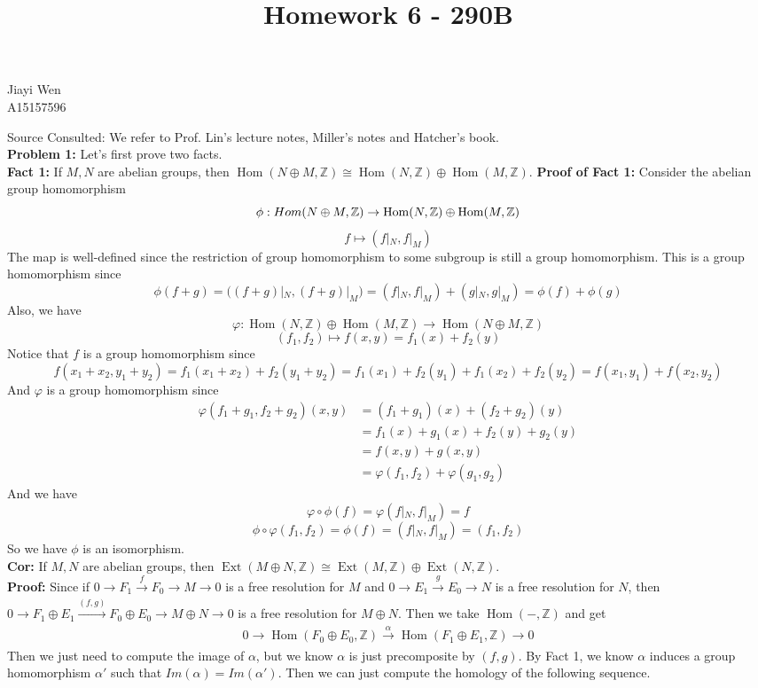 \documentclass[12pt]{amsart}
\newcommand{\Z}{\mathbb{Z}}
\newcommand{\Hom}{\operatorname{Hom}}
\newcommand{\Ext}{\operatorname{Ext}}
\begin{document}
\title{Homework 6 - 290B}
\maketitle
\begin{center}
    Jiayi Wen\\
    A15157596
\end{center}
Source Consulted: We refer to Prof. Lin's lecture notes, Miller's notes and Hatcher's book. \\
\textbf{Problem 1:} Let's first prove two facts.\\
\textbf{Fact 1:} If $M,N$ are abelian groups, then $\Hom(N\oplus M,\Z)\cong \Hom(N,\Z)\oplus \Hom(M,\Z)$. 
\textbf{Proof of Fact 1:} Consider the abelian group homomorphism 
\[\phi: \\Hom(N\oplus M, \Z)\to \Hom(N,\Z)\oplus \Hom(M,\Z)\]
\[f\mapsto(f|_N,f|_M)\]
The map is well-defined since the restriction of group homomorphism to some subgroup is still a group homomorphism. This is a group homomorphism since 
\[\phi(f+g)=\Big((f+g)|_N,(f+g)|_M\Big)=(f|_N,f|_M)+(g|_N,g|_M)=\phi(f)+\phi(g)\]
Also, we have 
\[\varphi:\Hom(N,\Z)\oplus \Hom(M,\Z)\to \Hom(N\oplus M, \Z)\]
\[(f_1,f_2)\mapsto f(x,y)=f_1(x)+f_2(y)\]
Notice that $f$ is a group homomorphism since 
\[f(x_1+x_2,y_1+y_2)=f_1(x_1+x_2)+f_2(y_1+y_2)=f_1(x_1)+f_2(y_1)+f_1(x_2)+f_2(y_2)=f(x_1,y_1)+f(x_2,y_2)\]
And $\varphi$ is a group homomorphism since 
\begin{align*}
    \varphi(f_1+g_1,f_2+g_2)(x,y)&=(f_1+g_1)(x)+(f_2+g_2)(y)\\&=f_1(x)+g_1(x)+f_2(y)+g_2(y)\\&=f(x,y)+g(x,y)\\&=\varphi(f_1,f_2)+\varphi(g_1,g_2)
\end{align*}
And we have 
\[\varphi\circ \phi(f)=\varphi(f|_N,f|_M)=f\]
\[\phi\circ \varphi(f_1,f_2)=\phi(f)=(f|_N,f|_M)=(f_1,f_2)\]
So we have $\phi$ is an isomorphism. \\
\textbf{Cor:} If $M,N$ are abelian groups, then $\Ext(M\oplus N,\Z)\cong \Ext(M,\Z)\oplus \Ext(N,\Z)$. \\
\textbf{Proof: }Since if $0\to F_1\xrightarrow[]{f} F_0\to M\to 0$ is a free resolution for $M$ and $0\to E_1\xrightarrow[]{g} E_0\to N$ is a free resolution for $N$, then $0\to F_1\oplus E_1\xrightarrow[]{(f,g)}
F_0\oplus E_0\to M\oplus N\to 0$ is a free resolution for $M\oplus N$. Then we take $\Hom(-,\Z)$ and get
\[0\to \Hom(F_0\oplus E_0,\Z)\xrightarrow[]{\alpha} \Hom(F_1\oplus E_1,\Z)\to 0\]
Then we just need to compute the image of $\alpha$, but we know $\alpha$ is just precomposite by $(f,g)$. By Fact 1, we know $\alpha$ induces a group homomorphism $\alpha'$ such that $Im(\alpha)=Im(\alpha')$. Then we can just compute the homology of the following sequence.
\end{document}
